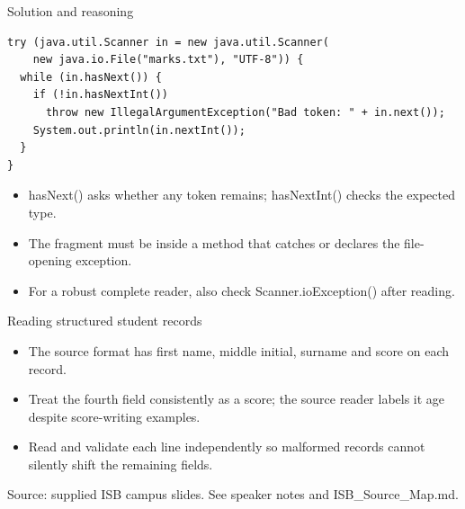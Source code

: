 \documentclass[10pt,aspectratio=169]{beamer}
\begin{document}
\begin{frame}[fragile,t]{Solution and reasoning}
\begin{lstlisting}
try (java.util.Scanner in = new java.util.Scanner(
    new java.io.File("marks.txt"), "UTF-8")) {
  while (in.hasNext()) {
    if (!in.hasNextInt())
      throw new IllegalArgumentException("Bad token: " + in.next());
    System.out.println(in.nextInt());
  }
}
\end{lstlisting}\vspace{1mm}\small\begin{itemize}
\item hasNext() asks whether any token remains; hasNextInt() checks the expected type.
\item The fragment must be inside a method that catches or declares the file-opening exception.
\item For a robust complete reader, also check Scanner.ioException() after reading.
\end{itemize}
\end{frame}

\begin{frame}[fragile,t]{Reading structured student records}
\begin{itemize}
\item The source format has first name, middle initial, surname and score on each record.
\item Treat the fourth field consistently as a score; the source reader labels it age despite score{-}writing examples.
\item Read and validate each line independently so malformed records cannot silently shift the remaining fields.
\end{itemize}
\vspace{3mm}\footnotesize\textcolor{accent}{Source: supplied ISB campus slides. See speaker notes and ISB\_Source\_Map.md.}
\end{frame}
\end{document}
